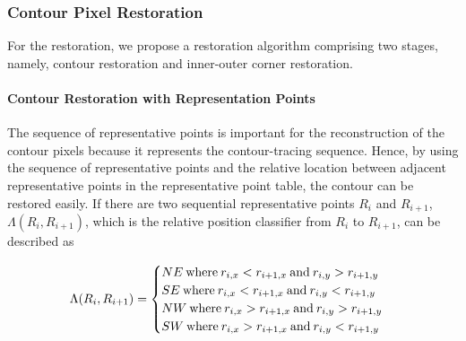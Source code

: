 \subsubsection{Contour Pixel Restoration}


For the restoration, we propose a restoration algorithm comprising two stages, namely, contour restoration and inner-outer corner restoration.


\paragraph{Contour Restoration with Representation Points}


The sequence of representative points is important for the reconstruction of the contour pixels because it represents the contour-tracing sequence. Hence, by using the sequence of representative points and the relative location between adjacent representative points in the representative point table, the contour can be restored easily. If there are two sequential representative points $R_i$ and $R_{i+1}$, $\Lambda(R_i, R_{i+1})$, which is the relative position classifier from $R_i$ to $R_{i+1}$, can be described as 

\begin{equation}
	\Lambda(R_i, R_{i+1}) = \begin{cases}
	NE\: \text{where\:} r_{i,x} < r_{i+1,x}\: \text{and\:} r_{i,y} > r_{i+1,y} \\ 
	SE\: \text{where\:} r_{i,x} < r_{i+1,x}\: \text{and\:} r_{i,y} < r_{i+1,y} \\ 
	NW\: \text{where\:} r_{i,x} > r_{i+1,x}\: \text{and\:} r_{i,y} > r_{i+1,y} \\ 
	SW\: \text{where\:} r_{i,x} > r_{i+1,x}\: \text{and\:} r_{i,y} < r_{i+1,y}
	\end{cases}
	\label{eq:lambda}
\end{equation}

